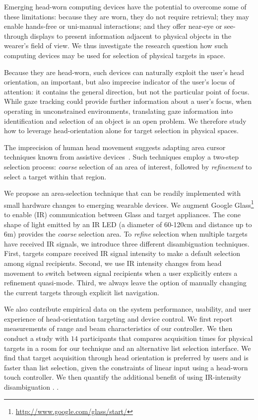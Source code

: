 Emerging head-worn computing devices have the potential to overcome some of these limitations: because they are worn, they do not require retrieval; they may enable hands-free or uni-manual interactions; and they offer near-eye or see-through displays to present information adjacent to physical objects in the wearer's field of view. We thus investigate the research question how such computing devices may be used for selection of physical targets in space.

Because they are head-worn, such devices can naturally exploit the user's head orientation, an important, but also imprecise indicator of the user's locus of attention: it contains the general direction, but not the particular point of focus. While gaze tracking could provide further information about a user's focus, when operating in unconstrained environments, translating gaze information into identification and selection of an object is an open problem.
We therefore study how to leverage head-orientation alone for target selection in physical spaces. 

The imprecision of human head movement suggests adapting area cursor techniques known from assistive devices~\cite{kabbash1995prince,worden1997making,findlater2010enhanced}. Such techniques employ a two-step selection process: {\em coarse} selection of an area of interest, followed by {\em refinement} to select a target within that region.

We propose an area-selection technique that can be readily implemented with small hardware changes to emerging wearable devices. We augment Google Glass\footnote{\url{http://www.google.com/glass/start/}} to enable (IR) communication between Glass and target appliances. The cone shape of light emitted by an IR LED (a diameter of 60-120cm and distance up to 6m) provides the {\em coarse} selection area. To {\em refine} selection when multiple targets have received IR signals, we introduce three different disambiguation techniques. First, targets compare received IR signal intensity to make a default selection among signal recipients. Second, we use IR intensity changes from head movement to switch between signal recipients when a user explicitly enters a refinement quasi-mode. Third, we always leave the option of manually changing the current targets through explicit list navigation.

We also contribute empirical data on the system performance, usability, and user experience of head-orientation targeting and device control. We first report measurements of range and beam characteristics of our controller. We then conduct a study with $14$ participants that compares acquisition times for physical targets in a room for our technique and an alternative list selection interface. We find that target acquisition through head orientation is preferred by users and is faster than list selection, given the constraints of linear input using a head-worn touch controller. 
We then quantify the additional benefit of using IR-intensity disambiguation . .

